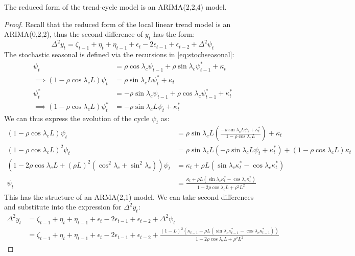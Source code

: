 \documentclass[DIV=14,titlepage=false]{scrreprt}
\begin{document}
\begin{claim}
    The reduced form of the trend-cycle model is an ARIMA(2,2,4) model.
\end{claim}
\begin{proof}
    Recall that the reduced form of the local linear trend model is an ARIMA(0,2,2), thus the second difference of $y_t$ has the form:
    \[
        \Delta ^2 y_t = \zeta_{t-1} + \eta_t + \eta_{t-1} + \epsilon_t - 2\epsilon_{t-1} + \epsilon_{t-2} + \Delta^2 \psi_t
    \]
    The stochastic seasonal is defined via the recursions in \eqref{eq:stochseasonal}:
    \begin{align*}
        \psi_t &= \rho \cos \lambda_c \psi_{t-1} + \rho \sin \lambda_c \psi^*_{t-1} + \kappa_t\\
        \implies (1-\rho \cos \lambda_c L) \psi_t &= \rho \sin \lambda_c L \psi^*_{t} + \kappa_t\\
        \psi_t^* &= -\rho \sin \lambda_c \psi_{t-1} + \rho \cos \lambda_c \psi^*_{t-1} + \kappa_t^*\\
        \implies (1-\rho \cos \lambda_c L) \psi_t^* &= -\rho \sin \lambda_c L \psi_{t} + \kappa_t^*
    \end{align*}
    We can thus express the evolution of the cycle $\psi_t$ as:
    \begin{align*}
        (1-\rho \cos \lambda_c L)\psi_t &= \rho \sin \lambda_c L \left( \frac{-\rho \sin \lambda_c L \psi_t + \kappa_t^*}{1 - \rho \cos \lambda_c L} \right) + \kappa_t\\
        (1-\rho \cos \lambda_c L)^2 \psi_t &= \rho \sin \lambda_c L \left( -\rho \sin \lambda_c L \psi_t + \kappa_t^* \right) + (1-\rho \cos \lambda_c L) \kappa_t\\
        (1-2\rho \cos \lambda_c L + (\rho L )^2( \cos^2 \lambda_c + \sin^2 \lambda_c)) \psi_t &= \kappa_t +\rho L (\sin \lambda_c \kappa_t^* - \cos \lambda_c \kappa_t^*)\\
        \psi_t &= \frac{\kappa_t +\rho L (\sin \lambda_c \kappa_t^* - \cos \lambda_c \kappa_t^*)}{1-2\rho \cos \lambda_c L + \rho^2L^2}
    \end{align*}
    This has the structure of an ARMA(2,1) model. We can take second differences and substitute into the expression for $\Delta^2 y_t$:
    \begin{align*}
        \Delta^2 y_t &= \zeta_{t-1} + \eta_t + \eta_{t-1} + \epsilon_t - 2\epsilon_{t-1} + \epsilon_{t-2} + \Delta^2 \psi_t\\
        &= \zeta_{t-1} + \eta_t + \eta_{t-1} + \epsilon_t - 2\epsilon_{t-1} + \epsilon_{t-2} + \frac{(1-L)^2(\kappa_{t-1} +\rho L (\sin \lambda_c \kappa_{t-1}^* - \cos \lambda_c \kappa_{t-1}^*))}{1-2\rho \cos \lambda_c L + \rho^2L^2}

\end{align*}
\end{proof}
\end{document}
